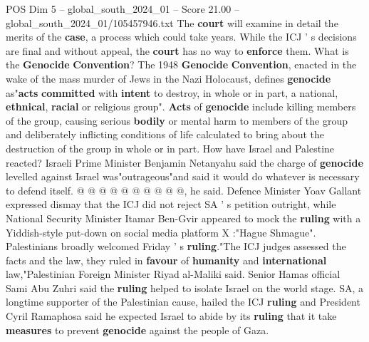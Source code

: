 \begin{textsample}{POS Dim 5 – global\_south\_2024\_01 – Score 21.00 – global\_south\_2024\_01/105457946.txt}
The \textbf{court} will examine in detail the merits of the \textbf{case}, a process which could take years.
While the ICJ ' s decisions are final and without appeal, the \textbf{court} has no way to \textbf{enforce} them.
What is the \textbf{Genocide} \textbf{Convention}?
The 1948 \textbf{Genocide} \textbf{Convention}, enacted in the wake of the mass murder of Jews in the Nazi Holocaust, defines \textbf{genocide} as"\textbf{acts} \textbf{committed} with \textbf{intent} to destroy, in whole or in part, a national, \textbf{ethnical}, \textbf{racial} or religious group". \textbf{Acts} of \textbf{genocide} include killing members of the group, causing serious \textbf{bodily} or mental harm to members of the group and deliberately inflicting conditions of life calculated to bring about the destruction of the group in whole or in part.
How have Israel and Palestine reacted?
Israeli Prime Minister Benjamin Netanyahu said the charge of \textbf{genocide} levelled against Israel was"outrageous"and said it would do whatever is necessary to defend itself. @ @ @ @ @ @ @ @ @ @, he said.
Defence Minister Yoav Gallant expressed dismay that the ICJ did not reject SA ' s petition outright, while National Security Minister Itamar Ben-Gvir appeared to mock the \textbf{ruling} with a Yiddish-style put-down on social media platform X :"Hague Shmague".
Palestinians broadly welcomed Friday ' s \textbf{ruling}."The ICJ judges assessed the facts and the law, they ruled in \textbf{favour} of \textbf{humanity} and \textbf{international} law,"Palestinian Foreign Minister Riyad al-Maliki said.
Senior Hamas official Sami Abu Zuhri said the \textbf{ruling} helped to isolate Israel on the world stage.
SA, a longtime supporter of the Palestinian cause, hailed the ICJ \textbf{ruling} and President Cyril Ramaphosa said he expected Israel to abide by its \textbf{ruling} that it take \textbf{measures} to prevent \textbf{genocide} against the people of Gaza.

\end{textsample}
